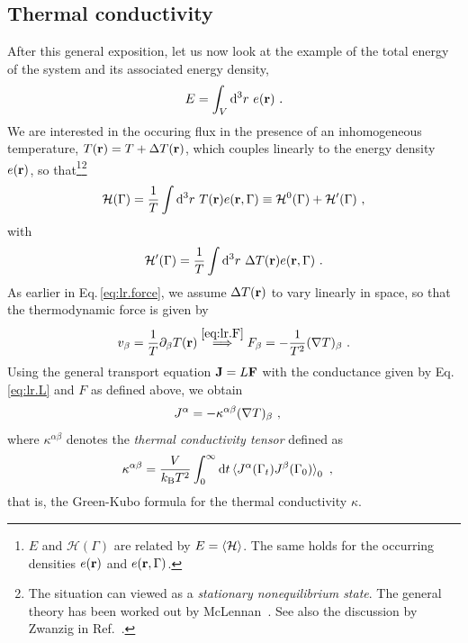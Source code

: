 \subsection{Thermal conductivity}
\label{sec:Thermal.Conductivity}
After this general exposition, let us now look at the example of the total energy of the system and its associated energy density,
\begin{align}
	E = \int_V \d^3 r ~ e(\b r)~.
	\label{eq:lr.E}
\end{align}
We are interested in the occuring flux in the presence of an inhomogeneous temperature, $T({\bf r}) = T + \Delta T({\bf r})$, which couples linearly to the energy density  $e ({\bf r})$, so that\footnote{$E$ and $\mathcal H(\Gamma)$ are related by $E = \braket{\mathcal H}$. The same holds for the occurring densities $e({\bf r})$ and $e ({\bf r}, \Gamma)$.}\footnote{The situation can viewed as a \emph{stationary nonequilibrium state}. The general theory has been worked out by McLennan~\cite{McLennan1959,McLennan1960}. See also the discussion by Zwanzig in Ref.~\cite{Zwanzig1965}.}
\begin{align}
	\mathcal H (\Gamma) = \frac{1}{T} \int {\rm d}^3 r ~ T ({\bf r}) e({\bf r}, \Gamma) 
		\equiv \mathcal H^0 (\Gamma) + \mathcal H' (\Gamma)~,
\end{align}
with
\begin{align}
	\mathcal H' (\Gamma) = \frac{1}{T} \int \d^3 r ~ \Delta T (\b r) e(\b r, \Gamma)~.
	\label{eq:lr.Hp.temp}
\end{align}
As earlier in Eq.\,\eqref{eq:lr.force}, we assume $\Delta T({\bf r})$ to vary linearly in space, so that the thermodynamic force is given by
\begin{align}
	v_\beta = \frac{1}{T} \partial_\beta T (\b r) 
		\stackrel{\eqref{eq:lr.F}}{\implies}
	F_\beta = - \frac{1}{T^2} (\b \nabla T)_\beta ~.
	\label{eq:lr.F.temp}
\end{align}
Using the general transport equation ${\bf J} = L {\bf F}$ with the conductance given by Eq.\,\eqref{eq:lr.L} and $F$ as defined above, we obtain
\begin{align}
	J^\alpha 
		&= - \kappa^{\alpha \beta} (\b \nabla T)_\beta~,
	\label{eq:lr.J.2}
\end{align}
where $\kappa^{\alpha \beta}$ denotes the \emph{thermal conductivity tensor} defined as
\begin{align}
	\kappa^{\alpha \beta}
		&=
		\frac{V}{k_{\rm B} T^2} \int_{0}^{\infty} 
		\d t \braket{J^\alpha (\Gamma_t) J^\beta (\Gamma_{0})}_0 ~,
	\label{eq:GreenKubo}
\end{align}
that is, the Green-Kubo formula for the thermal conductivity $\kappa$.

